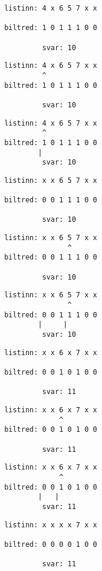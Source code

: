 { \begin{verbatim}
       listinn: 4 x 6 5 7 x x

       biltred: 1 0 1 1 1 0 0

                svar: 10
\end{verbatim}}
{ \begin{verbatim}
       listinn: 4 x 6 5 7 x x
                ^
       biltred: 1 0 1 1 1 0 0

                svar: 10
\end{verbatim}}
{ \begin{verbatim}
       listinn: 4 x 6 5 7 x x
                ^
       biltred: 1 0 1 1 1 0 0
               |
                svar: 10
\end{verbatim}}
{ \begin{verbatim}
       listinn: x x 6 5 7 x x

       biltred: 0 0 1 1 1 0 0

                svar: 10
\end{verbatim}}
{ \begin{verbatim}
       listinn: x x 6 5 7 x x
                      ^
       biltred: 0 0 1 1 1 0 0

                svar: 10
\end{verbatim}}
{ \begin{verbatim}
       listinn: x x 6 5 7 x x
                      ^
       biltred: 0 0 1 1 1 0 0
               |     |
                svar: 10
\end{verbatim}}
{ \begin{verbatim}
       listinn: x x 6 x 7 x x

       biltred: 0 0 1 0 1 0 0

                svar: 11
\end{verbatim}}
{ \begin{verbatim}
       listinn: x x 6 x 7 x x
                    ^
       biltred: 0 0 1 0 1 0 0

                svar: 11
\end{verbatim}}
{ \begin{verbatim}
       listinn: x x 6 x 7 x x
                    ^
       biltred: 0 0 1 0 1 0 0
               |   |
                svar: 11
\end{verbatim}}
{ \begin{verbatim}
       listinn: x x x x 7 x x

       biltred: 0 0 0 0 1 0 0

                svar: 11
\end{verbatim}}
